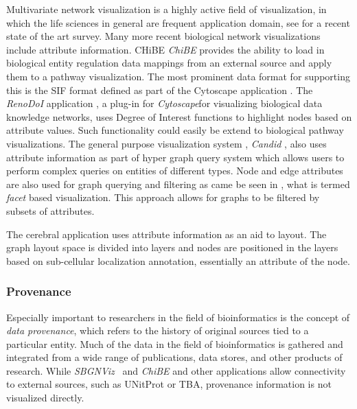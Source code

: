 \documentclass[journal]{vgtc}                %
\begin{document}
 
Multivariate network visualization is a highly active field of visualization, in which the life sciences in general are frequent application domain, see \cite{} for a recent state of the art survey. 
Many more recent  biological network visualizations include attribute information.
CHiBE \textit{ChiBE}\cite{Babur2010chibe} provides the ability to load in biological entity regulation data mappings from an external source and apply them to a pathway visualization.
The most prominent data format for supporting this is the SIF format defined as part of the Cytoscape application \cite{Shannon2003cytoscape}. 
The \textit{RenoDoI} application \cite{Vehlow2015}, a plug-in for \textit{Cytoscape}for visualizing biological data knowledge networks, uses Degree of Interest functions to highlight nodes based on attribute values.
Such functionality could easily be extend to biological pathway visualizations.
The general purpose visualization system , \textit{Candid} \cite{Shadoan2013}, also uses attribute information as part of hyper graph query system which allows users to perform complex queries on entities of different types.
Node and edge attributes are also used for graph querying and filtering as came be seen in , what is termed \textit{facet} based visualization. This approach allows for graphs to be filtered by subsets of attributes.

The cerebral application uses attribute information as an aid to layout. The graph layout space is divided into layers and nodes are positioned in the layers based  on sub-cellular localization annotation, essentially an attribute of the node.

\subsubsection{Provenance}

Especially important to researchers in the field of bioinformatics is the concept of \textit{data provenance}, which refers to the history of original sources tied to a particular entity. Much of the data in the field of bioinformatics is gathered and integrated from a wide range of publications, data stores, and other products of research.
While \textit{SBGNViz}~\cite{SBGNViz2015} and \textit{ChiBE}\cite{Babur2010chibe} and other applications allow connectivity to external sources, such as UNitProt or TBA, provenance information is not visualized directly.

\end{document}

